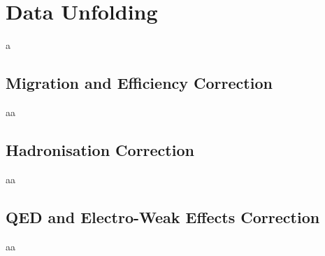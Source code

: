 \chapter{Data Unfolding}
a
\section{Migration and Efficiency Correction}
aa
\section{Hadronisation Correction}
aa
\section{QED and Electro-Weak Effects Correction}
aa
